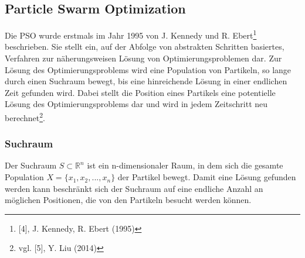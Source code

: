 \documentclass[a4paper, 11pt]{article}
\begin{document}
\subsection{Particle Swarm Optimization}
Die \acs{PSO} wurde erstmals im Jahr 1995 von J. Kennedy und R. Ebert\footnote{[4], J. Kennedy, R. Ebert (1995)} beschrieben. Sie stellt ein, auf der Abfolge von abstrakten Schritten basiertes, Verfahren zur näherungsweisen Lösung von Optimierungsproblemen dar. Zur Lösung des Optimierungsproblems wird eine Population von Partikeln, so lange durch einen Suchraum bewegt, bis eine hinreichende Lösung in einer endlichen Zeit gefunden wird. Dabei stellt die Position eines Partikels eine potentielle Lösung des Optimierungsproblems dar und wird in jedem Zeitschritt neu berechnet\footnote{vgl. [5], Y. Liu (2014)}.
\subsubsection{Suchraum}
Der Suchraum $S \subset \mathbb{R}^n$ ist ein n-dimensionaler Raum, in dem sich die gesamte Population $X=\{x_{1},x_{2},...,x_{n}\}$ der Partikel bewegt. Damit eine Lösung gefunden werden kann beschränkt sich der Suchraum auf eine endliche Anzahl an möglichen Positionen, die von den Partikeln besucht werden können.
\end{document}
